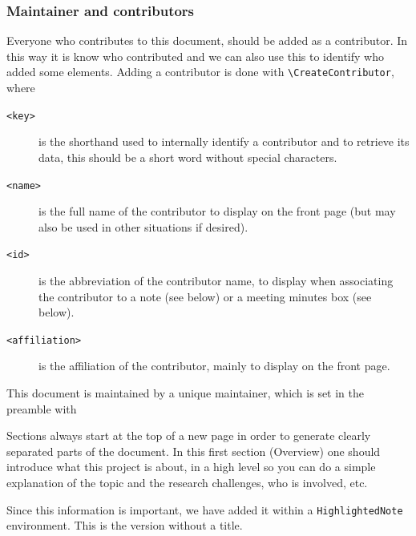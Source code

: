 \documentclass{project-logbook}
\begin{document}
		\subsubsection{Maintainer and contributors}
			Everyone who contributes to this document, should be added as a contributor. In this way it is know who contributed and we can also use this to identify who added some elements. Adding a contributor is done with \texttt{\textbackslash CreateContributor}, where
			\begin{description}
				\item[\texttt{<key>}] is the shorthand used to internally identify a contributor and to retrieve its data, this should be a short word without special characters.
				\item[\texttt{<name>}] is the full name of the contributor to display on the front page (but may also be used in other situations if desired).
				\item[\texttt{<id>}] is the abbreviation of the contributor name, to display when associating the contributor to a note (see below) or a meeting minutes box (see below).
				\item[\texttt{<affiliation>}] is the affiliation of the contributor, mainly to display on the front page.
    			\end{description}
			
			This document is maintained by a unique maintainer, which is set in the preamble with 
	
	\begin{HighlightedNote}{}
		Sections always start at the top of a new page in order to generate clearly separated parts of the document. In this first section (Overview) one should introduce what this project is about, in a high level so you can do a simple explanation of the topic and the research challenges, who is involved, etc.
		
		Since this information is important, we have added it within a \texttt{HighlightedNote} environment. This is the version without a title.
	\end{HighlightedNote}
	
\end{document}
